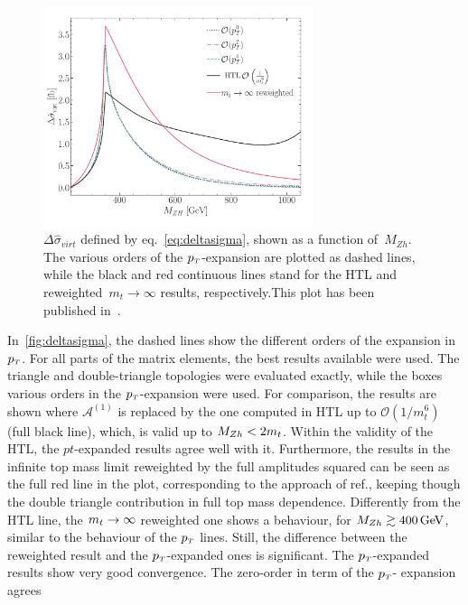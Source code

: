 \begin{figure}[th]
	\centering
	\includegraphics[width=0.7\textwidth]{./figures/sigma_part_virt_LMEreweighted.pdf}
	\caption{$\Delta \hat{\sigma}_{virt}$ defined by eq.~\eqref{eq:deltasigma}, shown as a function of~$M_{Zh}$. The various orders of the $p_{\scriptscriptstyle T}$-expansion are plotted as dashed lines, while the black and red continuous lines stand for the HTL and reweighted~$m_t \rightarrow \infty$ results, respectively.This plot has been published in~\cite{Alasfar:2021ppe}.}
	\label{fig:deltasigma}
\end{figure}
\par In~\autoref{fig:deltasigma}, the dashed lines show
the different orders of the expansion in $p_{\scriptscriptstyle T}$. 
For all parts of the matrix elements, the best results
available were used. The triangle and double-triangle
topologies were evaluated exactly, while the boxes various orders in the $p_{\scriptscriptstyle T}$-expansion were used.
For comparison, the results are shown where
$\mathcal{A}^{(1)}$ is replaced by the one computed in HTL up to
$\mathcal{O}(1/m_t^6)$ (full black line), which, is valid
up to $M_{Zh}< 2 m_t$.  Within the validity of the HTL, the $pt$-expanded
results agree well with it.
Furthermore, the results in the infinite top
mass limit reweighted by the full amplitudes squared can be seen as the full red line in the plot, corresponding to the approach of ref.\cite{Altenkamp:2012sx}, keeping though the double triangle
contribution in full top mass dependence. 
Differently from the HTL line, the $m_t \to \infty$ reweighted one
shows a behaviour, for  $M_{Zh} \gtrsim 400\,\textrm{GeV}$, similar to the behaviour of
the $p_{\scriptscriptstyle T}$ lines. Still,   the difference
between the reweighted result and the $p_{\scriptscriptstyle T}$-expanded ones is significant.
The $p_{\scriptscriptstyle T}$-expanded results show
very good convergence.  The zero-order in term of the $p_{\scriptscriptstyle T}$- expansion agrees
